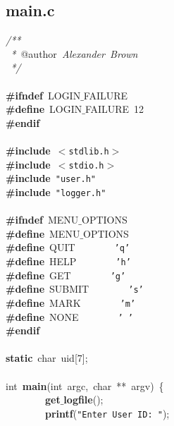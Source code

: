\subsection{main.c}
\scriptsize
\sffamily
\noindent
\mbox{}\textit{/**} \\
\mbox{}\textit{\ *\ }@author\textit{\ Alexander\ Brown} \\
\mbox{}\textit{\ */} \\
\mbox{} \\
\mbox{}\textbf{\#ifndef}\ LOGIN$\_$FAILURE \\
\mbox{}\textbf{\#define}\ LOGIN$\_$FAILURE\ 12 \\
\mbox{}\textbf{\#endif} \\
\mbox{} \\
\mbox{}\textbf{\#include}\ \texttt{$<$stdlib.h$>$} \\
\mbox{}\textbf{\#include}\ \texttt{$<$stdio.h$>$} \\
\mbox{}\textbf{\#include}\ \texttt{"{}user.h"{}} \\
\mbox{}\textbf{\#include}\ \texttt{"{}logger.h"{}} \\
\mbox{} \\
\mbox{}\textbf{\#ifndef}\ MENU$\_$OPTIONS \\
\mbox{}\textbf{\#define}\ MENU$\_$OPTIONS \\
\mbox{}\textbf{\#define}\ QUIT\ \ \ \ \ \ \ \ \texttt{'q'} \\
\mbox{}\textbf{\#define}\ HELP\ \ \ \ \ \ \ \ \texttt{'h'} \\
\mbox{}\textbf{\#define}\ GET\ \ \ \ \ \ \ \ \texttt{'g'} \\
\mbox{}\textbf{\#define}\ SUBMIT\ \ \ \ \ \ \ \ \texttt{'s'} \\
\mbox{}\textbf{\#define}\ MARK\ \ \ \ \ \ \ \ \texttt{'m'} \\
\mbox{}\textbf{\#define}\ NONE\ \ \ \ \ \ \ \ \texttt{'\ '} \\
\mbox{}\textbf{\#endif} \\
\mbox{} \\
\mbox{}\textbf{static}\ char\ uid[7]; \\
\mbox{} \\
\mbox{}int\ \textbf{main}(int\ argc,\ char\ **\ argv)\ \{ \\
\mbox{}\ \ \ \ \ \ \ \ \textbf{get$\_$logfile}(); \\
\mbox{}\ \ \ \ \ \ \ \ \textbf{printf}(\texttt{"{}Enter\ User\ ID:\ "{}}); \\
